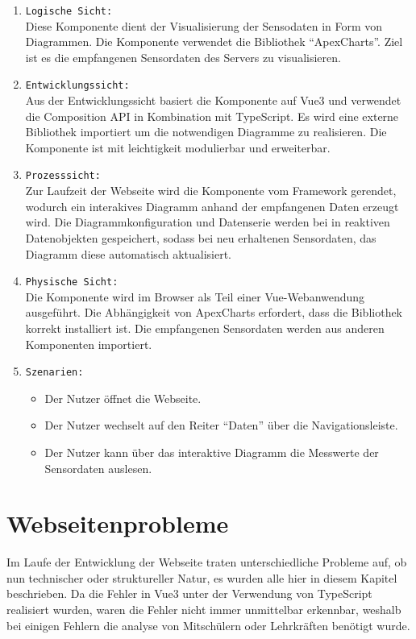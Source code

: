 \begin{enumerate}
  \item \texttt{Logische Sicht:} \\
  Diese Komponente dient der Visualisierung der Sensodaten in Form von Diagrammen.
  Die Komponente verwendet die Bibliothek ``ApexCharts''.
  Ziel ist es die empfangenen Sensordaten des Servers zu visualisieren. 
  \item \texttt{Entwicklungssicht:} \\
  Aus der Entwicklungssicht basiert die Komponente auf Vue3 und verwendet die Composition API
  in Kombination mit TypeScript.
  Es wird eine externe Bibliothek importiert um die notwendigen Diagramme zu realisieren.
  Die Komponente ist mit leichtigkeit modulierbar und erweiterbar. 
  \item \texttt{Prozesssicht:} \\
  Zur Laufzeit der Webseite wird die Komponente vom Framework gerendet, 
  wodurch ein interakives Diagramm anhand der empfangenen Daten erzeugt wird.
  Die Diagrammkonfiguration und Datenserie werden bei in reaktiven Datenobjekten gespeichert,
  sodass bei neu erhaltenen Sensordaten, das Diagramm diese automatisch aktualisiert. 
  \item \texttt{Physische Sicht:} \\
  Die Komponente wird im Browser als Teil einer Vue-Webanwendung ausgeführt.
  Die Abhängigkeit von ApexCharts erfordert, dass die Bibliothek korrekt installiert ist.
  Die empfangenen Sensordaten werden aus anderen Komponenten importiert.
  \item \texttt{Szenarien:} \\
    \begin{itemize}
      \renewcommand{\labelitemi}{$\Rightarrow$}
    \item Der Nutzer öffnet die Webseite.
    \item Der Nutzer wechselt auf den Reiter ``Daten'' über die Navigationsleiste.
    \item Der Nutzer kann über das interaktive Diagramm die Messwerte der Sensordaten auslesen. 
    \end{itemize}
\end{enumerate}

\section{Webseitenprobleme}
\label{subsec:problem_Webseite}
Im Laufe der Entwicklung der Webseite traten unterschiedliche Probleme auf,
ob nun technischer oder struktureller Natur, 
es wurden alle hier in diesem Kapitel beschrieben.
%
Da die Fehler in Vue3 unter der Verwendung von TypeScript realisiert wurden, 
waren die Fehler nicht immer unmittelbar erkennbar, 
weshalb bei einigen Fehlern die analyse von Mitschülern oder Lehrkräften benötigt wurde.

